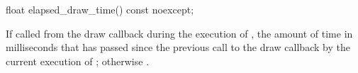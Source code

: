 %
\begin{itemdecl}
float elapsed_draw_time() const noexcept;
\end{itemdecl}
\begin{itemdescr}
\pnum
\returns
If called from the draw callback during the execution of , the amount of time in milliseconds that has passed since the previous call to the draw callback by the current execution of ; otherwise .
\end{itemdescr}
